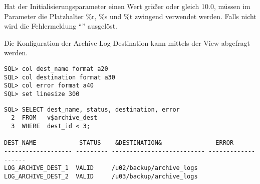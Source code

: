           \begin{merke}
            Hat der Initialisierungsparameter  einen Wert größer oder gleich 10.0, müssen im Parameter  die Platzhalter \%r, \%s und \%t zwingend verwendet werden. Falls nicht wird die Fehlermeldung \enquote{} ausgelöst.
          \end{merke}
          Die Konfiguration der Archive Log Destination kann mittels der View  abgefragt werden.
          \begin{lstlisting}[caption={Die Konfiguration der Archive Log Destination abfragen},label=admin50,language=sqlplus]
SQL> col dest_name format a20
SQL> col destination format a30
SQL> col error format a40
SQL> set linesize 300
					\end{lstlisting}
\begin{lstlisting}[caption={Die Konfiguration der Archive Log Destination abfragen - Fortsetzung},label=admin50a,language=oracle_sql]
SQL> SELECT dest_name, status, destination, error
  2  FROM   v$archive_dest
  3  WHERE  dest_id < 3;

DEST_NAME            STATUS    &DESTINATION&               ERROR
------------------- --------- -------------------------- -------------------
LOG_ARCHIVE_DEST_1  VALID     /u02/backup/archive_logs
LOG_ARCHIVE_DEST_2  VALID     /u03/backup/archive_logs
          \end{lstlisting}
